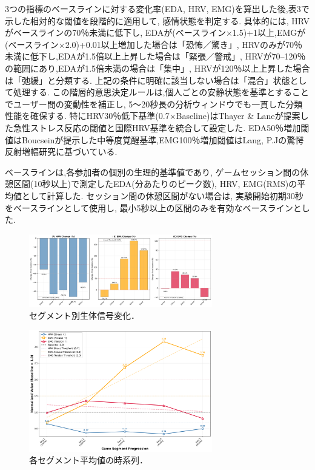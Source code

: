 \documentclass[a4paper]{jarticle}
\begin{document}
3つの指標のベースラインに対する変化率(EDA, HRV, EMG)を算出した後,表3で示した相対的な閾値を段階的に適用して, 感情状態を判定する. 具体的には, HRVがベースラインの70％未満に低下し, EDAが(ベースライン×1.5)+1以上,EMGが(ベースライン×2.0)+0.01以上増加した場合は「恐怖／驚き」, HRVのみが70％未満に低下し,EDAが1.5倍以上上昇した場合は「緊張／警戒」, HRVが70–120％の範囲にあり,EDAが1.5倍未満の場合は「集中」, HRVが120％以上上昇した場合は「弛緩」と分類する. 上記の条件に明確に該当しない場合は「混合」状態として処理する. この階層的意思決定ルールは,個人ごとの安静状態を基準とすることでユーザー間の変動性を補正し, 5～20秒長の分析ウィンドウでも一貫した分類性能を確保する. 特にHRV30％低下基準(0.7×Baseline)はThayer \& Laneが提案した急性ストレス反応の閾値\cite{bib12}と国際HRV基準\cite{bib06}を統合して設定した. EDA50％増加閾値はBoucseinが提示した中等度覚醒基準\cite{bib08},EMG100％増加閾値はLang, P.Jの驚愕反射増幅研究\cite{bib11}に基づいている.

ベースラインは,各参加者の個別の生理的基準値であり, ゲームセッション間の休憩区間(10秒以上)で測定したEDA(分あたりのピーク数), HRV, EMG(RMS)の平均値として計算した. セッション間の休憩区間がない場合は, 実験開始初期30秒をベースラインとして使用し, 最小5秒以上の区間のみを有効なベースラインとした.
 
\begin{figure}[tb]
  \begin{center}
    \includegraphics*[width=80mm]{figure6_segment_comparison.png}
  \end{center}
  \vspace*{-6mm}
  \caption{セグメント別生体信号変化．}
  \label{figure6}
\end{figure}

\begin{figure}[tb]
  \begin{center}
    \includegraphics*[width=80mm]{figure7_temporal_progression.png}
  \end{center}
  \vspace*{-6mm}
  \caption{各セグメント平均値の時系列．}
    \label{figure7}
\end{figure}
\end{document}
